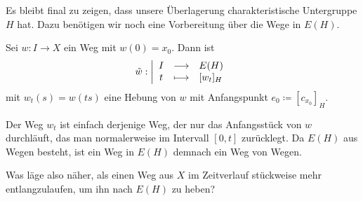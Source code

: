 Es bleibt final zu zeigen, dass unsere Überlagerung charakteristische Untergruppe $H$ hat. Dazu benötigen wir noch eine Vorbereitung über die Wege in  $E(H)$.

\begin{lemma}\label{lm:wege-partiell-zu-laufen-ist-ein-weg-in-e(h)}
    Sei $w\colon  I \to X$ ein Weg mit $w(0) = x_0$. Dann ist 
        \begin{equation*}
        \tilde{w}: \left| \begin{array}{c c l} 
            I & \longrightarrow & E(H) \\
            t & \longmapsto &  [w_t]_H
        \end{array} \right.
    \end{equation*}
    mit $w_t(s) = w(ts)$ eine Hebung von  $w$ mit Anfangspunkt  $e_0 \coloneqq  [c_{x_0}]_H$.
\end{lemma}

\begin{remark*}
    Der Weg $w_t$ ist einfach derjenige Weg, der nur das Anfangsstück von  $w$ durchläuft, das man normalerweise im Intervall  $[0,t]$ zurücklegt. Da  $E(H)$ aus Wegen besteht, ist ein Weg in  $E(H)$ demnach ein Weg von Wegen.

    Was läge also näher, als einen Weg aus $X$ im Zeitverlauf stückweise mehr entlangzulaufen, um ihn nach $E(H)$ zu heben?
\end{remark*}

